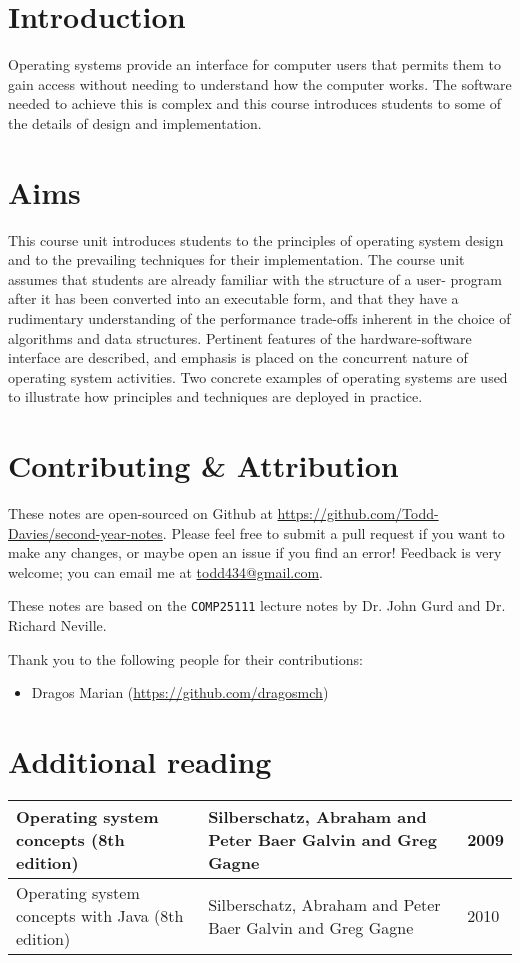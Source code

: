 \section*{Introduction}

Operating systems provide an interface for computer users that permits them to
gain access without needing to understand how the computer works. The software
needed to achieve this is complex and this course introduces students to some of
the details of design and implementation.

\section*{Aims}

This course unit introduces students to the principles of operating system
design and to the prevailing techniques for their implementation. The course
unit assumes that students are already familiar with the structure of a user-
program after it has been converted into an executable form, and that they have
a rudimentary understanding of the performance trade-offs inherent in the choice
of algorithms and data structures. Pertinent features of the hardware-software
interface are described, and emphasis is placed on the concurrent nature of
operating system activities. Two concrete examples of operating systems are used
to illustrate how principles and techniques are deployed in practice.

\section*{Contributing \& Attribution}

These notes are open-sourced on Github at
\url{https://github.com/Todd-Davies/second-year-notes}. Please feel free to
submit a pull request if you want to make any changes, or maybe open an issue
if you find an error! Feedback is very welcome; you can email me at
\href{mailto:todd434@gmail.com}{todd434@gmail.com}.

These notes are based on the \texttt{COMP25111} lecture notes by Dr. John Gurd
and Dr. Richard Neville.

Thank you to the following people for their contributions:
\begin{itemize}
  \item Dragos Marian (\url{https://github.com/dragosmch})
\end{itemize}

\section*{Additional reading}

\begin{tabularx}{\textwidth}{X|X|l}
  Operating system concepts (8th edition) & Silberschatz, Abraham and Peter Baer Galvin and Greg Gagne & 2009\\ \hline
  Operating system concepts with Java (8th edition) & Silberschatz, Abraham and Peter Baer Galvin and Greg Gagne & 2010
\end{tabularx}